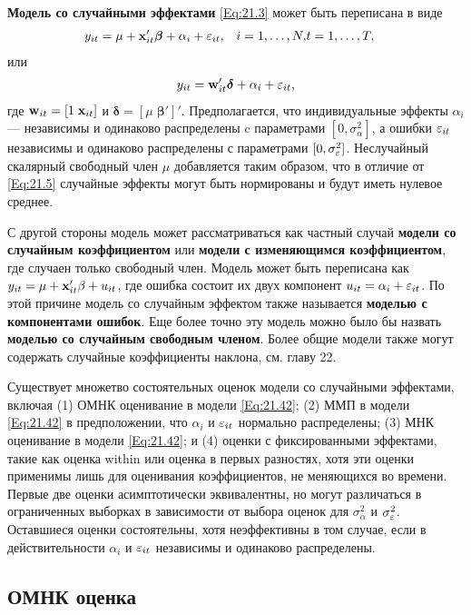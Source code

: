 \textbf{Модель со случайными эффектами} \ref{Eq:21.3} может быть переписана в виде
 \begin{align}
&y_{it}=\mu + \mathbf{x}'_{it} \bm\beta +\alpha_i + \varepsilon_{it},
&i=1, \dots, N,
& t=1, \dots, T,
\label{Eq:21.41}
\end{align}
или
 \begin{align}
y_{it}=\mathbf w'_{it} \bm\delta+\alpha_i + \varepsilon_{it},
\label{Eq:21.42}
\end{align}
где $\mathbf w_{it} = [1  \; \mathbf{x}_{it}]$ и $\bm\delta=[\mu \; \bm\beta']'$. Предполагается, что индивидуальные эффекты $\alpha_i$ --- независимы и одинаково распределены  c параметрами $[0, \sigma^2_{\alpha}]$, а ошибки $\varepsilon_{it}$ независимы и одинаково распределены с параметрами $[0, \sigma^2_\varepsilon]$. Неслучайный скалярный свободный член $\mu$ добавляется таким образом, что в отличие от \ref{Eq:21.5} случайные эффекты могут быть нормированы и будут иметь нулевое среднее.

С другой стороны модель может рассматриваться как частный случай \textbf{модели со случайным коэффициентом} или \textbf{модели с изменяющимся коэффициентом}, где случаен только свободный член. Модель может быть переписана как $y_{it}=\mu+\mathbf{x}'_{it}\beta+u_{it}$, где ошибка состоит их двух компонент $u_{it}=\alpha_i+\varepsilon_{it}$. По этой причине модель со случайным эффектом также называется \textbf{моделью с компонентами ошибок}. Еще более точно эту модель можно было бы назвать \textbf{моделью со случайным свободным членом}. Более общие модели также могут содержать случайные коэффициенты наклона, см. главу 22.

Существует множетво состоятельных оценок модели со случайными эффектами, включая (1) ОМНК оценивание в модели \ref{Eq:21.42}; (2) ММП в модели \ref{Eq:21.42} в предположении, что $\alpha_i$ и $\varepsilon_{it}$ нормально распределены; (3) МНК оценивание в модели \ref{Eq:21.42}; и (4) оценки с фиксированными эффектами, такие как оценка within или оценка в первых разностях, хотя эти оценки применимы лишь для оценивания коэффициентов, не меняющихся во времени. Первые две оценки асимптотически эквивалентны, но могут различаться в ограниченных выборках в зависимости от выбора оценок для $\sigma^2_{\alpha}$ и $\sigma^2_\varepsilon$. Оставшиеся оценки состоятельны, хотя неэффективны в том случае, если в действительности $\alpha_i$ и $\varepsilon_{it}$ независимы и одинаково распределены.

\subsection{ОМНК оценка}

